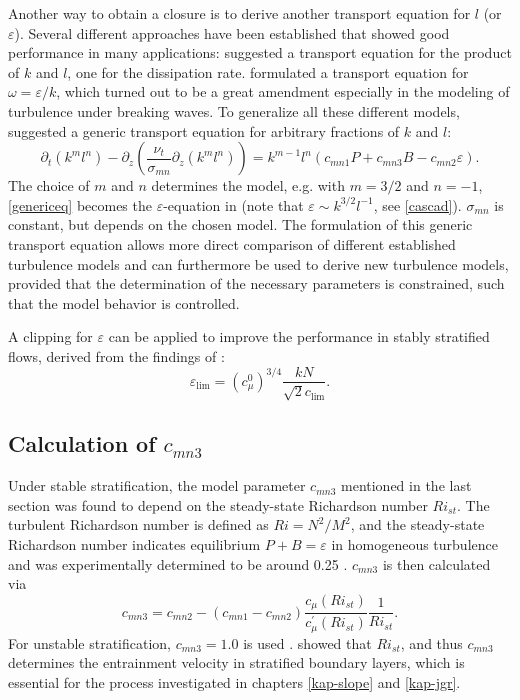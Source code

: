 Another way to obtain a closure is to derive another transport equation for $l$ 
(or $\varepsilon$). Several different approaches have been established that 
showed good performance in many applications: \cite{mellor1982} suggested a 
transport equation for the product of $k$ and $l$, \cite{burchard1995} one for 
the dissipation rate. \cite{wilcox1998} formulated a transport equation for 
$\omega = \varepsilon \slash k$, which turned out to be a great amendment 
especially in the modeling of turbulence under breaking waves. To generalize all 
these different models, \cite{UmlaufBurchard2003a} suggested a generic transport 
equation for arbitrary fractions of $k$ and $l$: 
\begin{equation}
 \label{genericeq}
 \partial_t (k^m l^n) - \partial_z \left( \frac{\nu_t}{\sigma_{mn}} 
\partial_z(k^m l^n) \right) = k^{m-1} l^n (c_{mn1}P + c_{mn3} B - c_{mn2} 
\varepsilon ).
\end{equation}
The choice of $m$ and $n$ determines the model, e.g. with $m=3 \slash 2$ and 
$n=-1$, \eqref{genericeq} becomes the $\varepsilon$-equation in 
\cite{burchard1995} (note that $\varepsilon \sim k^{3 \slash 2} l^{-1}$, see 
\eqref{cascad}). $\sigma_{mn}$ is constant, but depends on the chosen model. The 
formulation of this generic transport equation allows more direct comparison of 
different established turbulence models and can furthermore be used to derive 
new turbulence models, provided that the determination of the necessary 
parameters is constrained, such that the model behavior is controlled.

A clipping for $\varepsilon$ can be applied to improve the performance in 
stably stratified flows, derived from the findings of \citep{Galperin1988}:
\begin{equation}
 \label{galperin}
 \varepsilon_{\lim} = (c_\mu^0)^{3 \slash 4} \frac{kN}{\sqrt{2} c_{\lim}}.
\end{equation}

\subsection{Calculation of $c_{mn3}$ }

Under stable stratification, the model parameter $c_{mn3}$ mentioned in the 
last section was found to depend on the steady-state Richardson number 
$Ri_{st}$. The turbulent Richardson number is defined as $Ri = N^2 \slash 
M^2$, and the steady-state Richardson number indicates equilibrium $P + 
B = \varepsilon$ in homogeneous 
turbulence and was experimentally determined to be around 0.25 
\citep[][]{UmlaufBurchard2005a}. $c_{mn3}$ is then calculated via
\begin{equation}
 \label{cmn3}
 c_{mn3} = c_{mn2} - (c_{mn1} - c_{mn2}) \frac{c_\mu(Ri_{st})}{c_\mu^ \prime 
(Ri_{st})} \frac{1}{Ri_{st}}.
\end{equation}
For unstable stratification, $c_{mn3} = 1.0$ is used \citep[][]{Rodi1987}. 
\cite{UmlaufBurchard2005a} showed that $Ri_{st}$, and thus $c_{mn3}$ determines 
the entrainment velocity in stratified boundary layers, which is essential for 
the process investigated in chapters \ref{kap-slope} and \ref{kap-jgr}.

